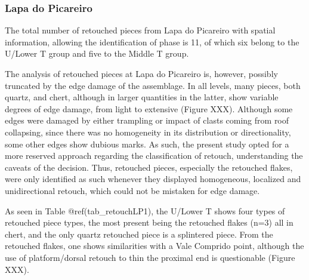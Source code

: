 \documentclass[12pt,twoside]{reedthesis}
\begin{document}
\hypertarget{lapa-do-picareiro-7}{%
\subsubsection{Lapa do Picareiro}\label{lapa-do-picareiro-7}}

The total number of retouched pieces from Lapa do Picareiro with spatial information, allowing the identification of phase is 11, of which six belong to the U/Lower T group and five to the Middle T group.

The analysis of retouched pieces at Lapa do Picareiro is, however, possibly truncated by the edge damage of the assemblage. In all levels, many pieces, both quartz, and chert, although in larger quantities in the latter, show variable degrees of edge damage, from light to extensive (Figure XXX). Although some edges were damaged by either trampling or impact of clasts coming from roof collapsing, since there was no homogeneity in its distribution or directionality, some other edges show dubious marks. As such, the present study opted for a more reserved approach regarding the classification of retouch, understanding the caveats of the decision. Thus, retouched pieces, especially the retouched flakes, were only identified as such whenever they displayed homogeneous, localized and unidirectional retouch, which could not be mistaken for edge damage.

As seen in Table @ref(tab\_retouchLP1), the U/Lower T shows four types of retouched piece types, the most present being the retouched flakes (n=3) all in chert, and the only quartz retouched piece is a splintered piece. From the retouched flakes, one shows similarities with a Vale Comprido point, although the use of platform/dorsal retouch to thin the proximal end is questionable (Figure XXX).
\end{document}
